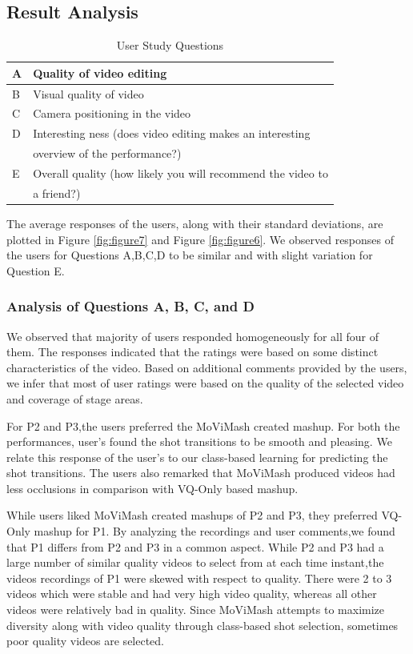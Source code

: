 \documentclass{sig-alternate}
\begin{document}
\subsection{Result Analysis}
\begin{table}
\centering
\caption{ User Study Questions }
\begin{tabular}{p{0.4cm}|p{8cm}} \hline
A& Quality of video editing\\ \hline
B&Visual quality of video\\ \hline
C& Camera positioning in the video\\ \hline
D& Interesting ness (does video editing makes an interesting\\ 
& overview of the performance?)\\ \hline
E &Overall quality (how likely you will recommend the video to\\
& a friend?)\\ \hline
\end{tabular}
\end{table}

The average responses of the users, along with their standard deviations, are plotted in Figure \ref{fig:figure7} and Figure \ref{fig:figure6}. We observed responses of the users for Questions A,B,C,D to be similar and with slight variation for Question E.

\subsubsection{ Analysis of Questions A, B, C, and D }
We observed that majority of users responded homogeneously for all four of them. The responses indicated that the ratings were based on some distinct characteristics of the video. Based on additional comments provided by the users, we infer that most of user ratings were based on the quality of the selected video and coverage of stage areas.

For P2 and P3,the users preferred the MoViMash created mashup. For both the performances, user’s found the shot transitions to be smooth and pleasing. We relate this response of the user’s to our class-based learning for predicting the shot transitions. The users also remarked that MoViMash produced videos had less occlusions in comparison with VQ-Only based mashup.

While users liked MoViMash created mashups of P2 and P3, they preferred VQ-Only mashup for P1. By analyzing the recordings and user comments,we found that P1 differs from P2 and P3 in a common aspect. While P2 and P3 had a large number of similar quality videos to select from at each time instant,the videos recordings of P1 were skewed with respect to quality. There were 2 to 3 videos which were stable and had very high video quality, whereas all other videos were relatively bad in quality. Since MoViMash attempts to maximize diversity along with video quality through class-based shot selection, sometimes poor quality videos are selected. 
\end{document}
